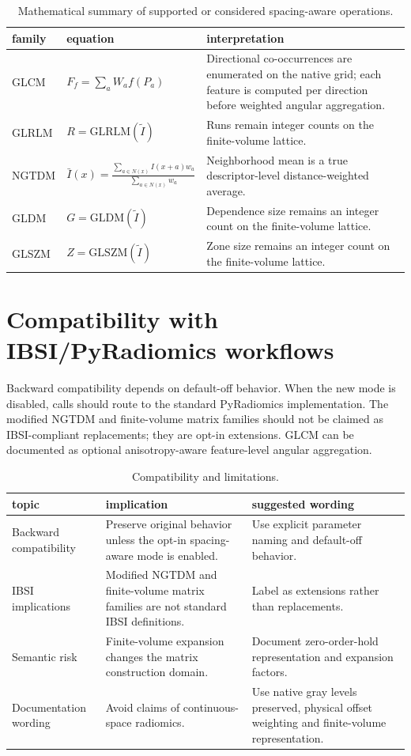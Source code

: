 \documentclass[11pt]{article}
\begin{document}
\begin{table}[t]
\centering
\small
\begin{tabular}{p{}p{}p{}}
\toprule
family & equation & interpretation \\
\midrule
GLCM & $F_f=\sum_a W_a f(P_a)$ & Directional co-occurrences are enumerated on the native grid; each feature is computed per direction before weighted angular aggregation. \\
GLRLM & $R=\mathrm{GLRLM}(\tilde I)$ & Runs remain integer counts on the finite-volume lattice. \\
NGTDM & $\bar I(x)=\frac{\sum_{a\in N(x)} I(x+a)w_a}{\sum_{a\in N(x)}w_a}$ & Neighborhood mean is a true descriptor-level distance-weighted average. \\
GLDM & $G=\mathrm{GLDM}(\tilde I)$ & Dependence size remains an integer count on the finite-volume lattice. \\
GLSZM & $Z=\mathrm{GLSZM}(\tilde I)$ & Zone size remains an integer count on the finite-volume lattice. \\
\bottomrule
\end{tabular}
\caption{Mathematical summary of supported or considered spacing-aware operations.}
\label{tab:math-summary}
\end{table}

\section{Compatibility with IBSI/PyRadiomics workflows}
Backward compatibility depends on default-off behavior. When the new mode is disabled, calls should route to the standard PyRadiomics implementation. The modified NGTDM and finite-volume matrix families should not be claimed as IBSI-compliant replacements; they are opt-in extensions. GLCM can be documented as optional anisotropy-aware feature-level angular aggregation.

\begin{table}[t]
\centering
\small
\begin{tabular}{p{}p{}p{}}
\toprule
topic & implication & suggested wording \\
\midrule
Backward compatibility & Preserve original behavior unless the opt-in spacing-aware mode is enabled. & Use explicit parameter naming and default-off behavior. \\
IBSI implications & Modified NGTDM and finite-volume matrix families are not standard IBSI definitions. & Label as extensions rather than replacements. \\
Semantic risk & Finite-volume expansion changes the matrix construction domain. & Document zero-order-hold representation and expansion factors. \\
Documentation wording & Avoid claims of continuous-space radiomics. & Use native gray levels preserved, physical offset weighting and finite-volume representation. \\
\bottomrule
\end{tabular}
\caption{Compatibility and limitations.}
\label{tab:compatibility}
\end{table}
\end{document}

